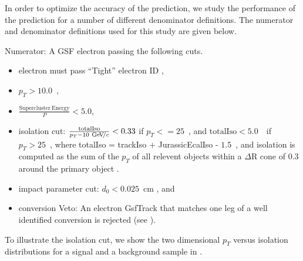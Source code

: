 \documentclass{cmspaper}
\begin{document}
In order to optimize the accuracy of the prediction, we study the performance of the prediction for a number of different denominator definitions. The numerator and denominator definitions used for this study are given below.

Numerator: A GSF electron passing the following cuts.
\begin{itemize}
\item electron must pass ``Tight'' electron ID \cite{electronID},
\item $p_T > 10.0$~\GeVc, 
\item $\frac{\mathrm{Supercluster\ Energy}}{P} < 5.0 $,
\item isolation cut: $\frac{\mathrm{totalIso}}{p_T - 10~\mathrm{Ge\kern -0.1em V}\!/c} < 0.33$ if $p_T <= 25$~\GeVc, and $\mathrm{totalIso} < 5.0$~\GeVc~if $p_T > 25$~\GeVc, where totalIso = trackIso + JurassicEcalIso - $1.5$~\GeVc , and isolation is computed as the sum of the $p_T$ of all relevent objects within a $\Delta$R cone of 0.3 around the primary object \cite{jurassicIsolation}.
\item impact parameter cut: $d_{0} < 0.025$~cm , and
\item conversion Veto: An electron GsfTrack that matches one leg of a well identified conversion is rejected (see ).
\end{itemize}

To illustrate the isolation cut, we show the two dimensional $p_T$ versus isolation distributions for a signal and a background sample in .
\end{document}
